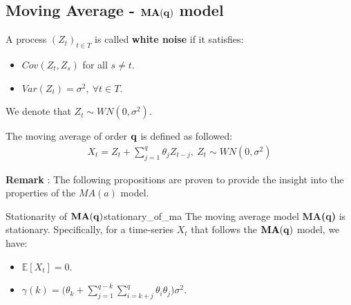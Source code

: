\subsection{Moving Average - $\bf MA(q)$ model}
\begin{definition}
    A process $(Z_t)_{t\in T}$ is called \textbf{white noise} if it satisfies:
    \begin{itemize}
        \item $Cov(Z_t, Z_s)$ for all $s\ne t$.
        \item $Var(Z_t) = \sigma^2, \ \forall t\in T$.
    \end{itemize}

    \noindent We denote that $Z_t\sim WN(0, \sigma^2)$.
\end{definition}

\begin{definition}[$\bf MA(q)$ model]
    The moving average of order $\bf q$ is defined as followed:
    \begin{align*}
        X_t = Z_t + \sum_{j=1}^q \theta_j Z_{t-j}, \ Z_t\sim WN(0,\sigma^2)
    \end{align*}
\end{definition}

\textbf{Remark} : The following propositions are proven to provide the insight into the properties of the $MA(a)$ model.

\begin{proposition}{Stationarity of $\bf MA(q)$}{stationary_of_ma}
    The moving average model \textbf{MA(q)} is stationary. Specifically, for a time-series $X_t$ that follows the ${\bf MA(q)}$ model, we have:
    \begin{itemize}
        \item $\mathbb{E}[X_t] = 0$.
        \item $\gamma(k) = \Bigg( \theta_k + \sum_{j=1}^{q-k}\sum_{i=k+j}^q \theta_i \theta_j \Bigg)\sigma^2$.
    \end{itemize}
\end{proposition}

